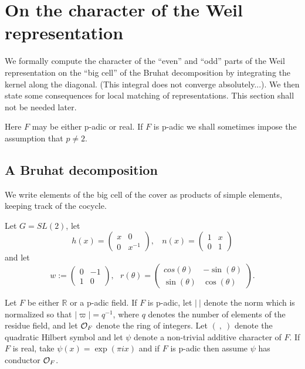 \documentclass[12pt,letterpaper]{book}
\theoremstyle{plain}
\theoremstyle{definition}
\theoremstyle{remark}
\theoremstyle{remark}
\begin{document}
\section{On the character of the Weil representation}\label{sec:weil}

We formally compute the character of the ``even'' and ``odd'' parts
of the Weil representation on the ``big cell'' of the Bruhat decomposition
by integrating the kernel along the diagonal. (This integral does not
converge absolutely...). We then state some consequences for local matching
of representations. This section shall not be needed later.

Here $F$ may be either p-adic or real. If $F$ is p-adic we shall
sometimes impose the assumption that $p\not= 2$.

\subsection{A Bruhat decomposition}

We write elements of the big cell of the cover as products of simple elements, keeping track of the cocycle.


Let $G=SL(2)$, let
\[
h(x)=\left(
\begin{array}{cc}
x & 0 \\
0 & x^{-1}
\end{array}
\right)
,\ \ \ \
n(x)=\left(
\begin{array}{cc}
1 & x \\
0 & 1
\end{array}
\right)
\]
and let
\[
w:=\left(
\begin{array}{cc}
0 & -1 \\
1 & 0
\end{array}
\right),\ \ \
r(\theta )=\left(
\begin{array}{cc}
cos(\theta) & -\sin(\theta) \\
\sin(\theta) & \cos(\theta)
\end{array}
\right) .
\]

Let $F$ be either ${\mathbb{R}}$ or a p-adic field.
If $F$ is p-adic, let $|\ |$ denote the norm which is normalized
so that $|\varpi|=q^{-1}$, where $q$ denotes the number of elements of the
residue field, and let ${\cal O}_F$ denote the ring of integers.
Let $(\ ,\ )$ denote
the quadratic Hilbert symbol and let $\psi$ denote a non-trivial
additive character of $F$. If $F$ is real, take $\psi(x)=\exp(\pi ix)$
and if $F$ is p-adic then assume $\psi$ has conductor ${\cal O}_F$.
\end{document}
